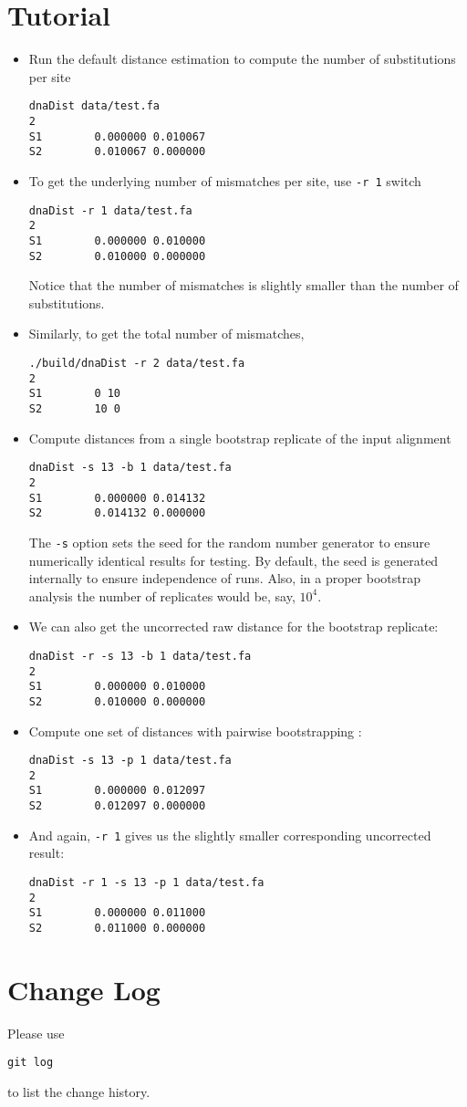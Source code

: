 \documentclass[a4paper, english]{article}
\newcommand{\ty}{\texttt}
\begin{document}
\section{Tutorial}
\begin{itemize}
\item Run the default distance estimation to compute the number of
  substitutions per site
\begin{verbatim}
dnaDist data/test.fa 
2
S1        0.000000 0.010067
S2        0.010067 0.000000
\end{verbatim}
\item To get the underlying number of mismatches
  per site, use \ty{-r 1} switch
\begin{verbatim}
dnaDist -r 1 data/test.fa 
2
S1        0.000000 0.010000
S2        0.010000 0.000000
\end{verbatim}
Notice that the number of mismatches is slightly smaller than the
number of substitutions.
\item Similarly, to get the total number of mismatches,
\begin{verbatim}
./build/dnaDist -r 2 data/test.fa 
2
S1        0 10
S2        10 0
\end{verbatim}
\item Compute distances from a single bootstrap replicate of the input alignment \citep{fel85:con}
\begin{verbatim}
dnaDist -s 13 -b 1 data/test.fa 
2
S1        0.000000 0.014132
S2        0.014132 0.000000
\end{verbatim}
The \ty{-s} option sets the seed for the random number generator to
ensure numerically identical results for testing. By default, the seed
is generated internally to ensure independence of runs. Also, in a
proper bootstrap analysis the number of replicates would be, say,
$10^4$.
\item We can also get the uncorrected raw distance for the bootstrap
  replicate:
\begin{verbatim}
dnaDist -r -s 13 -b 1 data/test.fa 
2
S1        0.000000 0.010000
S2        0.010000 0.000000
\end{verbatim}
\item Compute one set of distances with pairwise bootstrapping
  \citep{klo16:sup}:
\begin{verbatim}
dnaDist -s 13 -p 1 data/test.fa 
2
S1        0.000000 0.012097
S2        0.012097 0.000000
\end{verbatim}
\item And again, \ty{-r 1} gives us the slightly smaller corresponding
  uncorrected result:
\begin{verbatim}
dnaDist -r 1 -s 13 -p 1 data/test.fa 
2
S1        0.000000 0.011000
S2        0.011000 0.000000
\end{verbatim}
\end{itemize}

\section{Change Log}
Please use
\begin{verbatim}
git log
\end{verbatim}
to list the change history.


\end{document}
